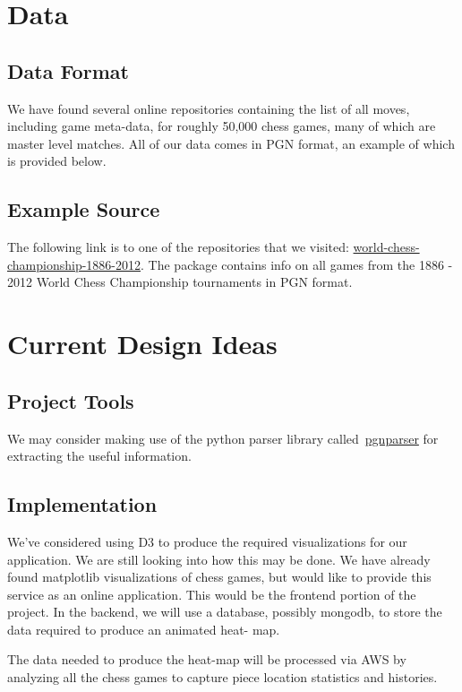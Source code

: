\documentclass[a4paper,10pt,oneside,leqno,titlepage,onecolumn]{article}
\begin{document}
\section*{Data}
\subsection{Data Format}
We have found several online repositories containing the list of all moves, including 
game meta-data, for roughly 50,000 chess games, many of which are master level matches. 
All of our data comes in PGN format, an example of which is provided below.


\subsection{Example Source}
The following link is to one of the repositories that we visited: \href{http://
www.chess.com/download/view/world-chess-championship-1886-2012}{world-chess-
championship-1886-2012}. The package contains info on all games from the 1886 - 2012 
World Chess Championship tournaments in PGN format. 

\section{Current Design Ideas}
\subsection{Project Tools}
We may consider making use of the python parser library called~\href{https://
pypi.python.org/pypi/pgnparser/1.0}{pgnparser} for extracting the useful information.

\subsection{Implementation}
We've considered using D3 to produce the required visualizations for our application. We 
are still looking into how this may be done. We have already found matplotlib 
visualizations of chess games, but would like to provide this service as an online 
application. This would be the frontend portion of the project. In the backend, we will 
use a database, possibly mongodb, to store the data required to produce an animated heat-
map. 

The data needed to produce the heat-map will be processed via AWS by analyzing all the 
chess games to capture piece location statistics and histories.
\end{document}
